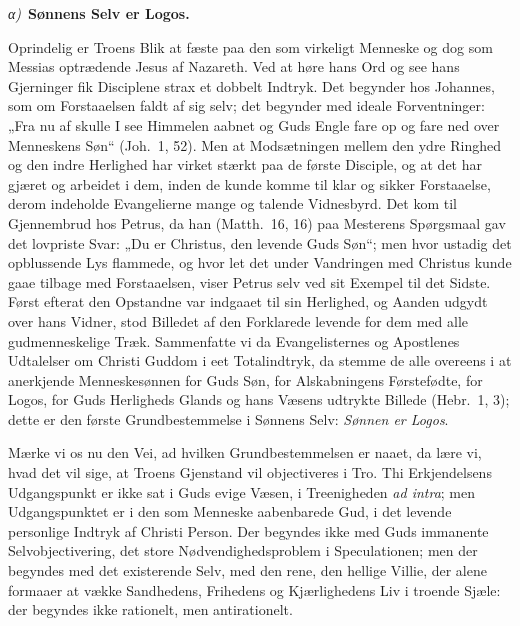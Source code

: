 \documentclass[12pt]{book}
\newcommand{\greekrun}[2]{%
  \medskip\begin{center}{\itshape #1)}\ {\bfseries #2}\end{center}\medskip}
\begin{document}
\greekrun{α}{Sønnens Selv er Logos.}

Oprindelig er Troens Blik at fæste paa den som virkeligt Menneske og
dog som Messias optrædende Jesus
af Nazareth. Ved at høre hans Ord og see hans Gjerninger fik
Disciplene strax et dobbelt Indtryk. Det begynder hos Johannes, som
om Forstaaelsen faldt af sig selv; det begynder med ideale
Forventninger: „Fra nu af skulle I see Himmelen aabnet og Guds Engle
fare op og fare ned over Menneskens Søn“ (Joh.\ 1, 52). Men at
Modsætningen mellem den ydre Ringhed og den indre Herlighed har
virket stærkt paa de første Disciple, og at det har gjæret og
arbeidet i dem, inden de kunde komme til klar og sikker Forstaaelse,
derom indeholde Evangelierne mange og talende Vidnesbyrd. Det kom
til Gjennembrud hos Petrus, da han (Matth.\ 16, 16) paa Mesterens
Spørgsmaal gav det lovpriste Svar: „Du er Christus, den levende Guds
Søn“; men hvor ustadig det opblussende Lys flammede, og hvor let det
under Vandringen med Christus kunde gaae tilbage med Forstaaelsen,
viser Petrus selv ved sit Exempel til det Sidste. Først efterat den
Opstandne var indgaaet til sin Herlighed, og Aanden udgydt over hans
Vidner, stod Billedet af den Forklarede levende for dem med alle
gudmenneskelige Træk. Sammenfatte vi da Evangelisternes og
Apostlenes Udtalelser om Christi Guddom i eet Totalindtryk, da
stemme de alle overeens i at anerkjende Menneskesønnen for Guds Søn,
for Alskabningens Førstefødte, for Logos, for Guds Herligheds Glands
og hans Væsens udtrykte Billede (Hebr.\ 1, 3); dette er den første
Grundbestemmelse i Sønnens Selv: \emph{Sønnen er Logos}.

Mærke vi os nu den Vei, ad hvilken Grundbestemmelsen er naaet, da
lære vi, hvad det vil sige, at Troens Gjenstand vil objectiveres i
Tro. Thi Erkjendelsens Udgangspunkt er ikke sat i Guds evige Væsen,
i Treenigheden \textit{ad intra}; men Udgangspunktet er i den som
Menneske aabenbarede Gud, i det levende personlige Indtryk af
Christi Person. Der begyndes ikke med Guds immanente
Selvobjectivering, det store Nødvendighedsproblem
i Speculationen; men der begyndes med det existerende Selv, med den
rene, den hellige Villie, der alene formaaer at vække Sandhedens,
Frihedens og Kjærlighedens Liv i troende Sjæle: der begyndes ikke
rationelt, men antirationelt.
\end{document}

